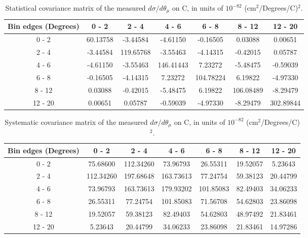 \documentclass[aps,prl,twocolumn,superscriptaddress,nofootinbib]{revtex4-1}
\begin{document}
\begin{table}[h!]
  \centering
  \caption{Statistical covariance matrix of the measured $d\sigma/d\theta_{\mu}$ on C, in units of $10^{-82}$ (cm$^{2}$/Degrees/C)$^{2}$.}
    \begin{tabular}{c||cccccc}
      Bin edges (Degrees) & 0 - 2 & 2 - 4 & 4 - 6 & 6 - 8 & 8 - 12 & 12 - 20 \\
\hline \hline
        0 - 2 & 60.13758 & -3.44584 & -4.61150 & -0.16505 &  0.03088 &  0.00651 \\
        2 - 4 & -3.44584 & 119.65768 & -3.55463 & -4.14315 & -0.42015 &  0.05787 \\
        4 - 6 & -4.61150 & -3.55463 & 146.41443 &  7.23272 & -5.48475 & -0.59039 \\
        6 - 8 & -0.16505 & -4.14315 &  7.23272 & 104.78224 &  6.19822 & -4.97330 \\
       8 - 12 &  0.03088 & -0.42015 & -5.48475 &  6.19822 & 106.08489 & -8.29479 \\
      12 - 20 &  0.00651 &  0.05787 & -0.59039 & -4.97330 & -8.29479 & 302.89844 \\
    \end{tabular}
  \label{tablecov:C_Statistical_ThetaMu}
\end{table}

\begin{table}[h!]
  \centering
  \caption{Systematic covariance matrix of the measured $d\sigma/d\theta_{\mu}$ on C, in units of $10^{-82}$ (cm$^{2}$/Degrees/C)$^{2}$.}
    \begin{tabular}{c||cccccc}
      Bin edges (Degrees) & 0 - 2 & 2 - 4 & 4 - 6 & 6 - 8 & 8 - 12 & 12 - 20 \\
\hline \hline
        0 - 2 & 75.68600 & 112.34260 & 73.96793 & 26.55311 & 19.52057 &  5.23643 \\
        2 - 4 & 112.34260 & 197.68648 & 163.73613 & 77.24754 & 59.38123 & 20.44799 \\
        4 - 6 & 73.96793 & 163.73613 & 179.93202 & 101.85083 & 82.49403 & 34.06233 \\
        6 - 8 & 26.55311 & 77.24754 & 101.85083 & 71.56708 & 54.62803 & 23.86098 \\
       8 - 12 & 19.52057 & 59.38123 & 82.49403 & 54.62803 & 48.97492 & 21.83461 \\
      12 - 20 &  5.23643 & 20.44799 & 34.06233 & 23.86098 & 21.83461 & 14.97286 \\
    \end{tabular}
  \label{tablecov:C_Systematic_ThetaMu}
\end{table}
\end{document}
